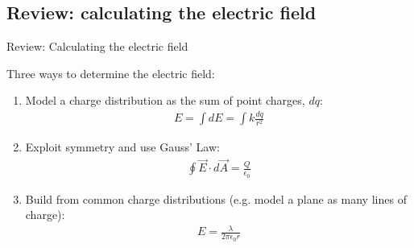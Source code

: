 \documentclass[aspectratio=169,
hyperref={colorlinks,urlcolor=blue}
]{beamer}
\begin{document}
\subsection{Review: calculating the electric field}
\label{subsec:reviewcalulatingtheelectricfield}
\begin{frame}{Review: Calculating the electric field}

Three ways to determine the electric field:
\begin{enumerate}
\item Model a charge distribution as the sum of point charges, $dq$:
\begin{align*}
E = \int dE=\int k\frac{dq}{r^2}
\end{align*}
\item Exploit symmetry and use Gauss' Law:
\begin{align*}
\oint \vec E \cdot d\vec A= \frac{Q}{\epsilon_0}
\end{align*}
\item Build from common charge distributions (e.g. model a plane as many lines of charge):
\begin{align*}
E=\frac{\lambda}{2\pi\epsilon_0 r}
\end{align*}
\end{enumerate}
\end{frame}




\end{document}
